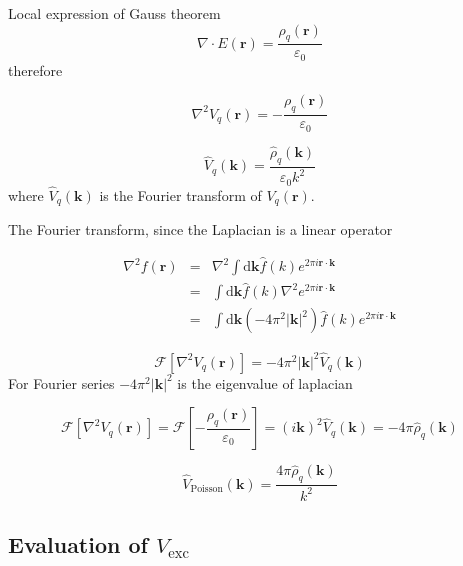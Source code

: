 Local expression of Gauss theorem 
\begin{equation}
\nabla\cdot E(\mathbf{r})=\frac{\rho_{q}(\mathbf{r})}{\varepsilon_{0}}
\end{equation}
therefore

\begin{equation}
\nabla^{2}V_{q}(\mathbf{r})=-\frac{\rho_{q}(\mathbf{r})}{\varepsilon_{0}}
\end{equation}


\begin{equation}
\hat{V}_{q}(\mathbf{k})=\frac{\hat{\rho}_{q}(\mathbf{k})}{\varepsilon_{0}k^{2}}
\end{equation}
where $\hat{V}_{q}(\mathbf{k})$ is the Fourier transform of $V_{q}(\mathbf{r})$.

The Fourier transform, since the Laplacian is a linear operator

\begin{eqnarray}
\nabla^{2}f(\mathbf{r}) & = & \nabla^{2}\int\mathrm{d}\mathbf{k}\hat{f}(k)e^{2\pi i\mathbf{r}\cdot\mathbf{k}}\\
 & = & \int\mathrm{d}\mathbf{k}\hat{f}(k)\nabla^{2}e^{2\pi i\mathbf{r}\cdot\mathbf{k}}\\
 & = & \int\mathrm{d}\mathbf{k}\left(-4\pi^{2}\left|\mathbf{k}\right|^{2}\right)\hat{f}(k)e^{2\pi i\mathbf{r}\cdot\mathbf{k}}
\end{eqnarray}


\begin{equation}
\mathcal{F}\left[\nabla^{2}V_{q}(\mathbf{r})\right]=-4\pi^{2}\left|\mathbf{k}\right|^{2}\hat{V}_{q}(\mathbf{k})
\end{equation}
For Fourier series $-4\pi^{2}\left|\mathbf{k}\right|^{2}$ is the
eigenvalue of laplacian 

\begin{equation}
\mathcal{F}\left[\nabla^{2}V_{q}(\mathbf{r})\right]=\mathcal{F}\left[-\frac{\rho_{q}(\mathbf{r})}{\varepsilon_{0}}\right]=\left(i\mathbf{k}\right)^{2}\hat{V}_{q}(\mathbf{k})=-4\pi\hat{\rho}_{q}(\mathbf{k})
\end{equation}


\begin{equation}
\hat{V}_{\mathrm{Poisson}}(\mathbf{k})=\frac{4\pi\hat{\rho}_{q}(\mathbf{k})}{k^{2}}
\end{equation}



\subsection{Evaluation of $V_{\mathrm{exc}}$}

